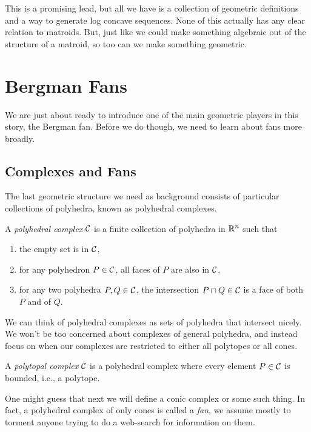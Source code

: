 \documentclass[12pt,oneside]{../../sfsuthesis}
\begin{document}
This is a promising lead, but all we have is a collection of geometric definitions and a way to generate log concave sequences.
None of this actually has any clear relation to matroids.
But, just like we could make something algebraic out of the structure of a matroid, so too can we make something geometric.

\section{Bergman Fans}

We are just about ready to introduce one of the main geometric players in this story, the Bergman fan.
Before we do though, we need to learn about fans more broadly.

\subsection{Complexes and Fans}
The last geometric structure we need as background consists of particular collections of polyhedra, known as polyhedral complexes.
\begin{definition}\th\label{def:polyhedralComplex}
    A \emph{polyhedral complex} \( \mathcal{C} \) is a finite collection of polyhedra in \( \mathbb{R}^n \) such that
    \begin{enumerate}
        \item the empty set is in \( \mathcal{C} \),
        \item for any polyhedron \( P \in \mathcal{C} \), all faces of \( P \) are also in \( \mathcal{C} \),
        \item for any two polyhedra \( P, Q \in \mathcal{C} \), the intersection \( P \cap Q \in \mathcal{C} \) is a face of both \( P \) and of \( Q \).
    \end{enumerate}
\end{definition}
We can think of polyhedral complexes as sets of polyhedra that intersect nicely.
We won't be too concerned about complexes of general polyhedra, and instead focus on when our complexes are restricted to either all polytopes or all cones.
\begin{definition}\th\label{def:polytopalComplex}
    A \emph{polytopal complex} \( \mathcal{C} \) is a polyhedral complex where every element \( P \in \mathcal{C} \) is bounded, i.e., a polytope.
\end{definition}
One might guess that next we will define a conic complex or some such thing.
In fact, a polyhedral complex of only cones is called a \emph{fan}, we assume mostly to torment anyone trying to do a web-search for information on them.
\end{document}
